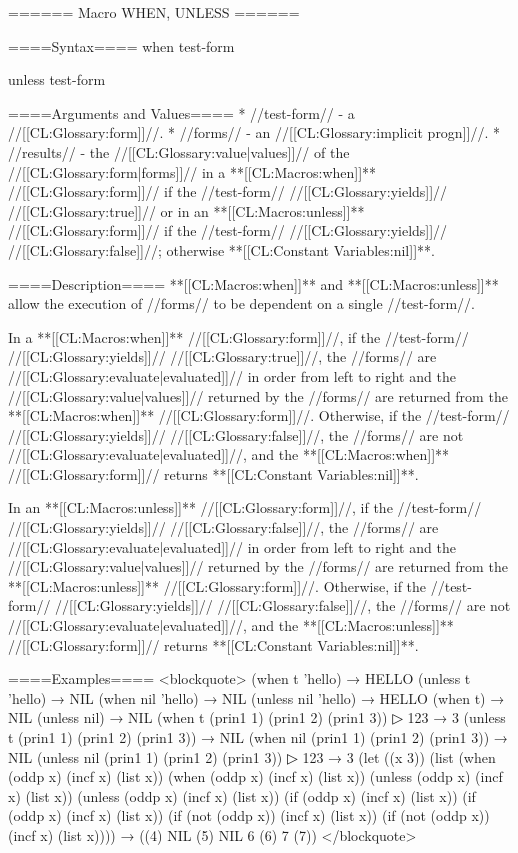 ====== Macro WHEN, UNLESS ======

====Syntax====
\DefmacWithValues when {test-form } {}

\DefmacWithValues unless {test-form } {}

====Arguments and Values====
  * //test-form// - a //[[CL:Glossary:form]]//.
  * //forms// - an //[[CL:Glossary:implicit progn]]//.
  * //results// - the //[[CL:Glossary:value|values]]// of the //[[CL:Glossary:form|forms]]// in a **[[CL:Macros:when]]** //[[CL:Glossary:form]]// if the //test-form// //[[CL:Glossary:yields]]// //[[CL:Glossary:true]]// or in an **[[CL:Macros:unless]]** //[[CL:Glossary:form]]// if the //test-form// //[[CL:Glossary:yields]]// //[[CL:Glossary:false]]//; otherwise **[[CL:Constant Variables:nil]]**.

====Description====
**[[CL:Macros:when]]** and **[[CL:Macros:unless]]** allow the execution of //forms// to be dependent on a single //test-form//.

In a **[[CL:Macros:when]]** //[[CL:Glossary:form]]//, if the //test-form// //[[CL:Glossary:yields]]// //[[CL:Glossary:true]]//, the //forms// are //[[CL:Glossary:evaluate|evaluated]]// in order from left to right and the //[[CL:Glossary:value|values]]// returned by the //forms// are returned from the **[[CL:Macros:when]]** //[[CL:Glossary:form]]//. Otherwise, if the //test-form// //[[CL:Glossary:yields]]// //[[CL:Glossary:false]]//, the //forms// are not //[[CL:Glossary:evaluate|evaluated]]//, and the **[[CL:Macros:when]]** //[[CL:Glossary:form]]// returns **[[CL:Constant Variables:nil]]**.

In an **[[CL:Macros:unless]]** //[[CL:Glossary:form]]//, if the //test-form// //[[CL:Glossary:yields]]// //[[CL:Glossary:false]]//, the //forms// are //[[CL:Glossary:evaluate|evaluated]]// in order from left to right and the //[[CL:Glossary:value|values]]// returned by the //forms// are returned from the **[[CL:Macros:unless]]** //[[CL:Glossary:form]]//. Otherwise, if the //test-form// //[[CL:Glossary:yields]]// //[[CL:Glossary:false]]//, the //forms// are not //[[CL:Glossary:evaluate|evaluated]]//, and the **[[CL:Macros:unless]]** //[[CL:Glossary:form]]// returns **[[CL:Constant Variables:nil]]**.

====Examples====
<blockquote> (when t 'hello) → HELLO (unless t 'hello) → NIL (when nil 'hello) → NIL (unless nil 'hello) → HELLO (when t) → NIL (unless nil) → NIL (when t (prin1 1) (prin1 2) (prin1 3))
▷ 123 → 3 (unless t (prin1 1) (prin1 2) (prin1 3)) → NIL (when nil (prin1 1) (prin1 2) (prin1 3)) → NIL (unless nil (prin1 1) (prin1 2) (prin1 3))
▷ 123 → 3 (let ((x 3)) (list (when (oddp x) (incf x) (list x)) (when (oddp x) (incf x) (list x)) (unless (oddp x) (incf x) (list x)) (unless (oddp x) (incf x) (list x)) (if (oddp x) (incf x) (list x)) (if (oddp x) (incf x) (list x)) (if (not (oddp x)) (incf x) (list x)) (if (not (oddp x)) (incf x) (list x)))) → ((4) NIL (5) NIL 6 (6) 7 (7)) </blockquote>

